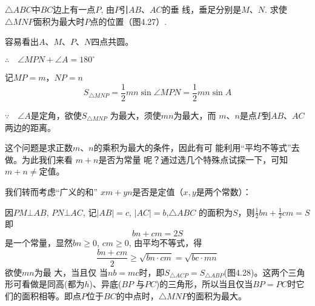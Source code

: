 \begin{example}
$\triangle ABC$中$BC$边上有一点$P$, 由$P$引$AB$、$AC$的垂
线，垂足分别是$M$、$N$. 求使
$\triangle MNP$面积为最大时$P$点的位置（图4.27）.
\end{example}

\begin{analyze}
    容易看出$A$、$M$、$P$、$N$四点共圆。

    $\therefore\quad \angle MPN+\angle A=180^{\circ}$

记$MP=m$，$NP=n$
\[S_{\triangle MNP}=\frac{1}{2}mn\sin\angle MPN=\frac{1}{2}mn\sin A\]

$\because\quad \angle A$是定角，欲使$S_{\triangle MNP}$
为最大，须使$mn$为最大，而
$m$、$n$是点$P$到$AB$、$AC$两边的距离。

这个问题是求正数$m$、$n$的乘积为最大的条件，因此有可
能利用“平均不等式”去做。为此我们来看
$m+n$是否为常量
呢？通过选几个特殊点试探一下，可知
$m+n\ne $定值。

\begin{minipage}{.45\textwidth}
\centering
{}
\end{minipage}
\hfill
\begin{minipage}{.45\textwidth}
\centering
{}
\end{minipage}

我们转而考虑“广义的和”
$xm+yn$是否是定值（$x,y$是两个常数）：

因$PM\bot AB$, $PN\bot AC$, 记$|AB|=c$, $|AC|=b$,$\triangle ABC$
的面积为$S$，则$\frac{1}{2}bn+\frac{1}{2}cm=S$
即
\[bn+cm=2S\]
是一个常量，显然$bn\geqslant0$, $cm\geq0$, 
由平均不等式，得
$$\frac{bn+cm}{2}\geq\sqrt{bn\cdot cm}=\sqrt{bc\cdot mn}$$
欲使$mn$为最 大，当且仅 当$nb=mc$时，即$S_{\triangle ACP}=S_{\triangle ABP}$(图4.28)。这两个三角形可看做是同高(都为$h$)、异底($BP$ 与$PC$)的三角形，所以当且仅当$BP=PC$时它们的面积相等。即点$P$位于$BC$的中点时，$\triangle MNP$的面积为最大。
\end{analyze}

